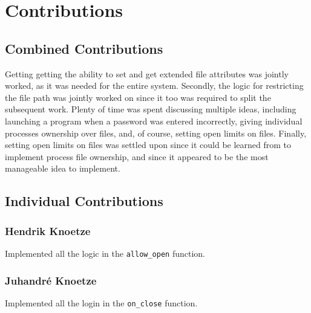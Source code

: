 \section{Contributions}

\subsection{Combined Contributions}

Getting getting the ability to set and get extended file attributes was jointly worked, as it was needed for the entire system. Secondly, the logic for restricting the file path was jointly worked on since it too was required to split the subsequent work. Plenty of time was spent discussing multiple ideas, including launching a program when a password was entered incorrectly, giving individual processes ownership over files, and, of course, setting open limits on files. Finally, setting open limits on files was settled upon since it could be learned from to implement process file ownership, and since it appeared to be the most manageable idea to implement.

\subsection{Individual Contributions}

\subsubsection*{Hendrik Knoetze}

Implemented all the logic in the \texttt{allow\_open} function.

\subsubsection*{Juhandr\'e Knoetze}

Implemented all the login in the \texttt{on\_close} function.


